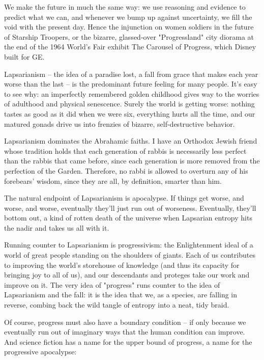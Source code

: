 We make the future in much the same way: we use reasoning and
evidence to predict what we can, and whenever we bump up against
uncertainty, we fill the void with the present day. Hence the
injunction on women soldiers in the future of Starship Troopers, or
the bizarre, glassed-over "Progressland" city diorama at the end of
the 1964 World's Fair exhibit The Carousel of Progress, which
Disney built for GE.

Lapsarianism -- the idea of a paradise lost, a fall from grace that
makes each year worse than the last -- is the predominant future
feeling for many people. It's easy to see why: an imperfectly
remembered golden childhood gives way to the worries of adulthood
and physical senescence. Surely the world is getting worse: nothing
tastes as good as it did when we were six, everything hurts all the
time, and our matured gonads drive us into frenzies of bizarre,
self-destructive behavior.

Lapsarianism dominates the Abrahamic faiths. I have an Orthodox
Jewish friend whose tradition holds that each generation of rabbis
is necessarily less perfect than the rabbis that came before, since
each generation is more removed from the perfection of the Garden.
Therefore, no rabbi is allowed to overturn any of his forebears'
wisdom, since they are all, by definition, smarter than him.

The natural endpoint of Lapsarianism is apocalypse. If things get
worse, and worse, and worse, eventually they'll just run out of
worseness. Eventually, they'll bottom out, a kind of rotten death
of the universe when Lapsarian entropy hits the nadir and takes us
all with it.

Running counter to Lapsarianism is progressivism: the Enlightenment
ideal of a world of great people standing on the shoulders of
giants. Each of us contributes to improving the world's storehouse
of knowledge (and thus its capacity for bringing joy to all of us),
and our descendants and proteges take our work and improve on it.
The very idea of "progress" runs counter to the idea of
Lapsarianism and the fall: it is the idea that we, as a species,
are falling in reverse, combing back the wild tangle of entropy
into a neat, tidy braid.

Of course, progress must also have a boundary condition -- if only
because we eventually run out of imaginary ways that the human
condition can improve. And science fiction has a name for the upper
bound of progress, a name for the progressive apocalypse:

